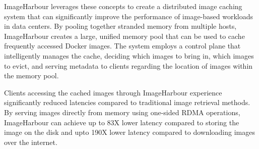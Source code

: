 ImageHarbour leverages these concepts to create a distributed image caching system that can significantly improve the performance of image-based workloads in data centers. By pooling together stranded memory from multiple hosts, ImageHarbour creates a large, unified memory pool that can be used to cache frequently accessed Docker images. The system employs a control plane that intelligently manages the cache, deciding which images to bring in, which images to evict, and serving metadata to clients regarding the location of images within the memory pool.

Clients accessing the cached images through ImageHarbour experience significantly reduced latencies compared to traditional image retrieval methods. By serving images directly from memory using one-sided RDMA operations, ImageHarbour can achieve up to 83X lower latency compared to storing the image on the disk and upto 190X lower latency compared to downloading images over the internet.
